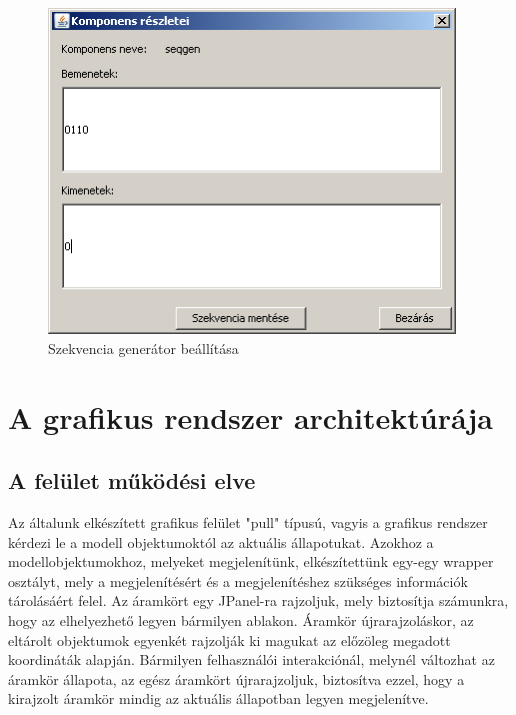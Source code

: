 \begin{figure}[H]
\begin{center}
\includegraphics[width=4.25in]{chapters/chapter11/screenshots/details_sg.png}
\caption{Szekvencia generátor beállítása}
\label{fig:gui_szimseb}
\end{center}
\end{figure}


\section{A grafikus rendszer architektúrája}

\subsection{A felület működési elve}

Az általunk elkészített grafikus felület "pull" típusú, vagyis a grafikus rendszer kérdezi le a modell objektumoktól az aktuális állapotukat.
Azokhoz a modellobjektumokhoz, melyeket megjelenítünk, elkészítettünk egy-egy wrapper osztályt, mely a megjelenítésért és a megjelenítéshez szükséges információk tárolásáért felel. 
Az áramkört egy JPanel-ra rajzoljuk, mely biztosítja számunkra, hogy az elhelyezhető legyen bármilyen ablakon. Áramkör újrarajzoláskor, az eltárolt objektumok egyenkét rajzolják ki magukat az előzöleg megadott koordináták alapján.
Bármilyen felhasználói interakciónál, melynél változhat az áramkör állapota, az egész áramkört újrarajzoljuk, biztosítva ezzel, hogy a kirajzolt áramkör mindig az aktuális állapotban legyen megjelenítve.


